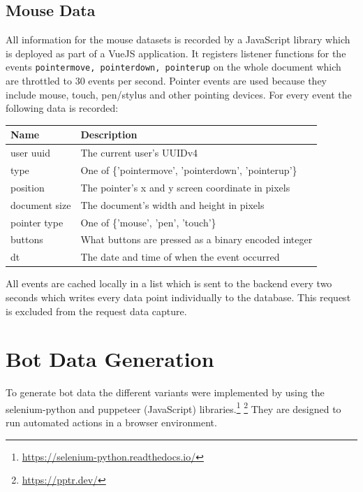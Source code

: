 \documentclass[
    fontsize=12pt,
    headings=small,
    parskip=half,           %
    bibliography=totoc,
    numbers=noenddot,       %
    open=any,               %
    final,                   %
    table
]{scrreprt}
\begin{document}
\subsection{Mouse Data}

All information for the mouse datasets is recorded by a JavaScript library which is deployed as part of a VueJS application. It registers listener functions for the events \lstinline{pointermove, pointerdown, pointerup} on the whole document which are throttled to $30$ events per second. Pointer events are used because they include mouse, touch, pen/stylus and other pointing devices. For every event the following data is recorded:

\begin{table}[H]
\begin{center}
\begin{tabular*}{\textwidth}{ll @{\extracolsep{\fill}}}
\toprule
Name & Description \\
\midrule
user uuid & The current user's UUIDv4 \\
type & One of \{'pointermove', 'pointerdown', 'pointerup'\} \\
position & The pointer's x and y screen coordinate in pixels \\
document size & The document's width and height in pixels \\
pointer type & One of \{'mouse', 'pen', 'touch'\} \\
buttons & What buttons are pressed as a binary encoded integer \\
dt & The date and time of when the event occurred \\
\bottomrule
\end{tabular*}
\end{center}
\end{table}

All events are cached locally in a list which is sent to the backend every two seconds which writes every data point individually to the database. This request is excluded from the request data capture.

\section{Bot Data Generation}

To generate bot data the different variants were implemented by using the selenium-python and puppeteer (JavaScript) libraries.\footnote{\url{https://selenium-python.readthedocs.io/}} \footnote{\url{https://pptr.dev/}} They are designed to run automated actions in a browser environment.
\end{document}
